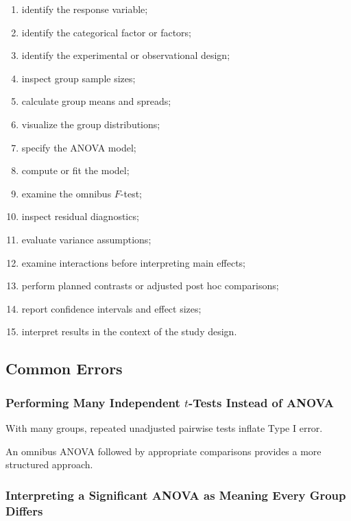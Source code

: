 \begin{enumerate}
    \item identify the response variable;
    \item identify the categorical factor or factors;
    \item identify the experimental or observational design;
    \item inspect group sample sizes;
    \item calculate group means and spreads;
    \item visualize the group distributions;
    \item specify the ANOVA model;
    \item compute or fit the model;
    \item examine the omnibus \(F\)-test;
    \item inspect residual diagnostics;
    \item evaluate variance assumptions;
    \item examine interactions before interpreting main effects;
    \item perform planned contrasts or adjusted post hoc comparisons;
    \item report confidence intervals and effect sizes;
    \item interpret results in the context of the study design.
\end{enumerate}

\subsection{Common Errors}
\label{subsec:anova-common-errors}

\subsubsection{Performing Many Independent \(t\)-Tests Instead of ANOVA}

With many groups, repeated unadjusted pairwise tests inflate Type I error.

An omnibus ANOVA followed by appropriate comparisons provides a more
structured approach.

\subsubsection{Interpreting a Significant ANOVA as Meaning Every Group Differs}

